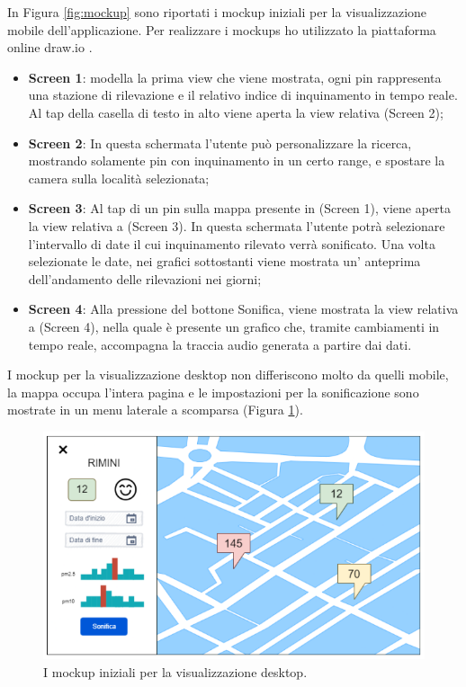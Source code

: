 In Figura \ref{fig:mockup} sono riportati i mockup iniziali per la visualizzazione mobile dell'applicazione.
Per realizzare i mockups ho utilizzato la piattaforma online draw.io \cite{drawio}.
\begin{itemize}
    \item \textbf{Screen 1}: modella la prima view che viene mostrata, ogni pin rappresenta una stazione di rilevazione e il relativo indice di inquinamento in tempo reale. Al tap della casella di testo in alto viene aperta la view relativa (Screen 2);
    \item \textbf{Screen 2}: In questa schermata l’utente può personalizzare la ricerca, mostrando solamente pin con inquinamento in un certo range, e spostare la camera sulla località selezionata;
    \item \textbf{Screen 3}: Al tap di un pin sulla mappa presente in (Screen 1), viene aperta la view relativa a (Screen 3). In questa schermata l’utente potrà selezionare l’intervallo di date il cui inquinamento rilevato verrà sonificato. Una volta selezionate le date, nei grafici sottostanti viene mostrata un’ anteprima dell’andamento delle rilevazioni nei giorni;
    \item \textbf{Screen 4}: Alla pressione del bottone Sonifica, viene mostrata la view relativa a (Screen 4), nella quale è presente un grafico che, tramite cambiamenti in tempo reale, accompagna la traccia audio generata a partire dai dati.
\end{itemize}

I mockup per la visualizzazione desktop non differiscono molto da quelli mobile, la mappa occupa l'intera pagina e le impostazioni per la sonificazione sono mostrate in un menu laterale a scomparsa (Figura \ref{fig:desktopmockup}).
\begin{figure}[H]
    \includegraphics[width=\linewidth]{img/desktopmockup.PNG}
    \caption{I mockup iniziali per la visualizzazione desktop.}
    \label{fig:desktopmockup}
\end{figure}




